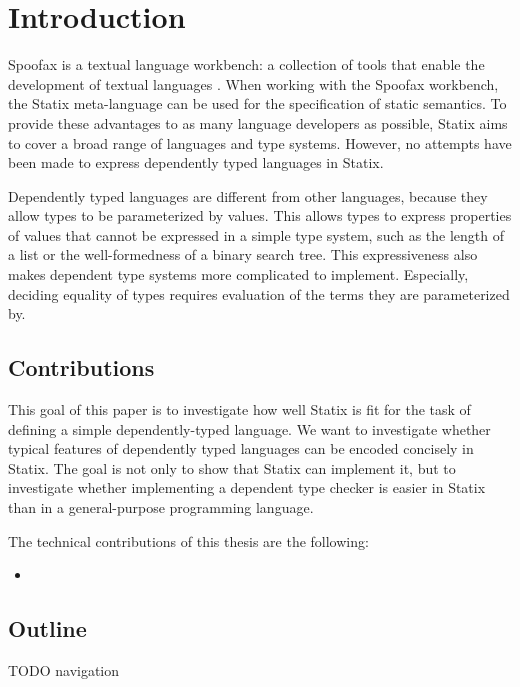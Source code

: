 \chapter{Introduction}

Spoofax is a textual language workbench: \label{key}a collection of tools that enable the development of textual languages \cite{spoofax}. When working with the Spoofax workbench, the Statix meta-language can be used for the specification of static semantics. To provide these advantages to as many language developers as possible, Statix aims to cover a broad range of languages and type systems. However, no attempts have been made to express dependently typed languages in Statix. 

Dependently typed languages are different from other languages, because they allow types to be parameterized by values. This allows types to express properties of values that cannot be expressed in a simple type system, such as the length of a list or the well-formedness of a binary search tree. This expressiveness also makes dependent type systems more complicated to implement. Especially, deciding equality of types requires evaluation of the terms they are parameterized by. 

\section{Contributions}
This goal of this paper is to investigate how well Statix is fit for the task of defining a simple dependently-typed language. We want to investigate whether typical features of dependently typed languages can be encoded concisely in Statix. The goal is not only to show that Statix can implement it, but to investigate whether implementing a dependent type checker is easier in Statix than in a general-purpose programming language. 

The technical contributions of this thesis are the following:
\begin{itemize}
	\item 
\end{itemize}

\section{Outline}

TODO navigation
